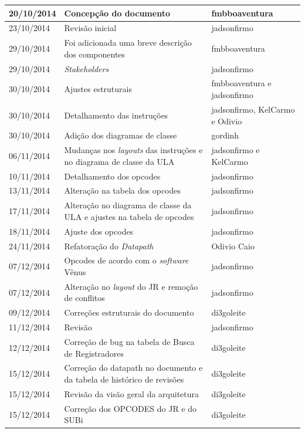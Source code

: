\documentclass{report}
\begin{document}
\begin{center}
\begin{longtable}[pos]{|m{2cm} | m{8cm} | m{4cm}|}
		20/10/2014 & Concepção do documento & fmbboaventura \\ \hline
		23/10/2014 & Revisão inicial & jadsonfirmo \\ \hline
		29/10/2014 & Foi adicionada uma breve descrição dos componentes & fmbboaventura \\ \hline       
		29/10/2014 & \textit{Stakeholders} & jadsonfirmo \\ \hline
		30/10/2014 & Ajustes estruturais & fmbboaventura e jadsonfirmo \\ \hline
		30/10/2014 & Detalhamento das instruções & jadsonfirmo, KelCarmo e Odivio \\ \hline
		30/10/2014 & Adição dos diagramas de classe & gordinh \\ \hline
		06/11/2014 & Mudanças nos \textit{layouts} das instruções e no diagrama de classe da ULA & jadsonfirmo e KelCarmo \\ \hline
		10/11/2014 & Detalhamento dos opcodes & jadsonfirmo \\ \hline
		13/11/2014 & Alteração na tabela dos opcodes & jadsonfirmo \\ \hline
		17/11/2014 & Alteração no diagrama de classe da ULA e ajustes na tabela de opcodes & jadsonfirmo \\ \hline
		18/11/2014 & Ajuste dos opcodes & jadsonfirmo \\ \hline
		24/11/2014 & Refatoração do \textit{Datapath} & Odivio Caio \\ \hline
		07/12/2014 & Opcodes de acordo com o \textit{software} Vênus & jadsonfirmo \\ \hline
		07/12/2014 & Alteração no \textit{layout} do JR e remoção de conflitos & jadsonfirmo \\ \hline
		09/12/2014 & Correções estruturais do documento & di3goleite \\ \hline
		11/12/2014 & Revisão & jadsonfirmo \\ \hline
		12/12/2014 & Correção de bug na tabela de Busca de Registradores & di3goleite \\ \hline
		15/12/2014 & Correção do datapath no documento e da tabela de histórico de revisões & di3goleite \\ \hline
		15/12/2014 & Revisão da visão geral da arquitetura & di3goleite \\ \hline
		15/12/2014 & Correção dos OPCODES do JR e do SUBi & di3goleite \\ \hline
	\end{longtable}
\end{center}
\end{document}
